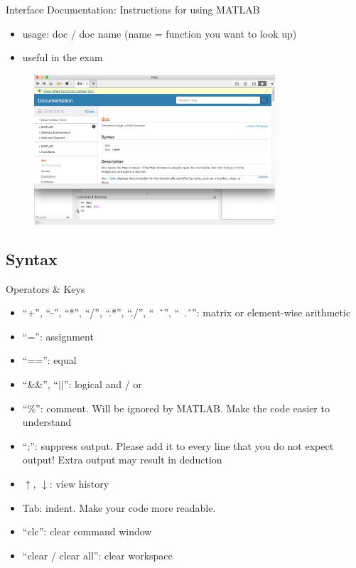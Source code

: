 \begin{frame}{Interface}
Documentation: Instructions for using MATLAB
\begin{itemize}
\item usage: doc / doc name (name = function you want to look up)
\item useful in the exam
\end{itemize}
\begin{figure}[htbp]
\centering
\includegraphics[width=0.8\textwidth]{pic/documentation.png}
\end{figure}
\end{frame}

\subsection{Syntax}
\begin{frame}{Operators \& Keys}
\begin{itemize}
\item ``+'', ``-'', ``*'', ``/'', ``.*'', ``./'', ``\ \^\ '', ``\ .\^\ '': matrix or element-wise arithmetic
\item ``='': assignment
\item ``=='': equal
\item ``\&\&'', ``$||$'': logical and / or
\item ``\%'': comment. Will be ignored by MATLAB. Make the code easier to understand
\item ``;'': suppress output. Please add it to every line that you do not expect output! Extra output may result in deduction
\item $\uparrow$, $\downarrow$: view history
\item Tab: indent. Make your code more readable.
\item ``clc'': clear command window
\item ``clear / clear all'': clear workspace
\end{itemize}
\end{frame}

